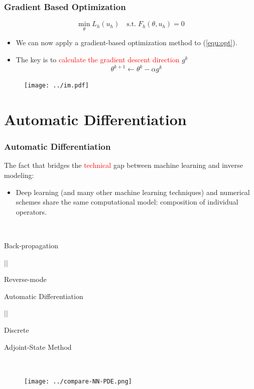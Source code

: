 \documentclass{beamer}
\begin{document}
\begin{frame}
	\frametitle{Gradient Based Optimization}
	\begin{equation}\label{equ:opt}
		\min_{\theta} L_h(u_h) \quad \mathrm{s.t.}\; F_h(\theta, u_h) = 0
		\end{equation}
	
	\begin{itemize}
		\item We can now apply a gradient-based optimization method to (\ref{equ:opt}).
		\item The key is to \textcolor{red}{calculate the gradient descent direction} $g^k$
		$$\theta^{k+1} \gets \theta^k - \alpha g^k$$ 
	\end{itemize}
	
	\begin{figure}[hbt]
	\centering
  \texttt{[image: ../im.pdf]}
\end{figure}

\end{frame}



\section{Automatic Differentiation}

\begin{frame}
	\frametitle{Automatic Differentiation}
The fact that bridges the \textcolor{red}{technical} gap between machine learning and inverse modeling:
	\begin{itemize}
		\item Deep learning (and many other machine learning techniques) and numerical schemes share the same computational model: composition of individual operators. 
	\end{itemize}
	

\begin{minipage}[t]{0.4\textwidth}

\



\begin{center}
	Back-propagation 

$||$

Reverse-mode

 Automatic Differentiation 

$||$
 
 Discrete 
 
 Adjoint-State Method
\end{center}
\end{minipage}~
\begin{minipage}[t]{0.6\textwidth}
\begin{figure}[hbt]
  \texttt{[image: ../compare-NN-PDE.png]}
\end{figure}
\end{minipage}

\end{frame}
\end{document}
